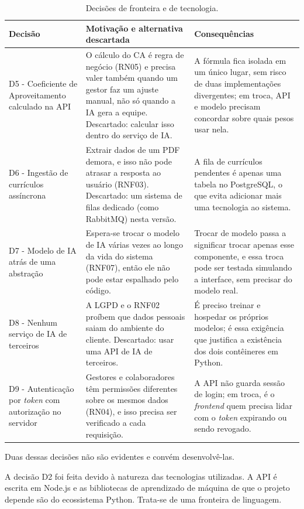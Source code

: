 \documentclass[a4paper,12pt,oneside,openany]{book}
\begin{document}
\begin{table}[H]
\centering
\small
\caption{Decisões de fronteira e de tecnologia.}
\label{tab:adr-fronteira}
\begin{tabularx}{0.97\textwidth}{p{} X X}
\toprule
\textbf{Decisão} & \textbf{Motivação e alternativa descartada} &
\textbf{Consequências} \\
\midrule
D5 - Coeficiente de Aproveitamento calculado na API & O cálculo do CA é
regra de negócio (RN05) e precisa valer também quando um gestor faz um ajuste
manual, não só quando a IA gera a equipe. Descartado: calcular isso dentro do
serviço de IA. & A fórmula fica isolada em um único lugar, sem risco de duas
implementações divergentes; em troca, API e modelo precisam concordar sobre
quais pesos usar nela. \\
D6 - Ingestão de currículos assíncrona & Extrair dados de um PDF demora, e
isso não pode atrasar a resposta ao usuário (RNF03). Descartado: um sistema
de filas dedicado (como RabbitMQ) nesta versão. & A fila de currículos
pendentes é apenas uma tabela no PostgreSQL, o que evita adicionar mais uma
tecnologia ao sistema. \\
D7 - Modelo de IA atrás de uma abstração & Espera-se trocar o modelo de IA
várias vezes ao longo da vida do sistema (RNF07), então ele não pode estar
espalhado pelo código. & Trocar de modelo passa a significar trocar apenas
esse componente, e essa troca pode ser testada simulando a interface, sem
precisar do modelo real. \\
D8 - Nenhum serviço de IA de terceiros & A LGPD e o RNF02 proíbem que dados
pessoais saiam do ambiente do cliente. Descartado: usar uma API de IA de
terceiros. & É preciso treinar e hospedar os próprios modelos; é essa
exigência que justifica a existência dos dois contêineres em Python. \\
D9 - Autenticação por \textit{token} com autorização no servidor &
Gestores e colaboradores têm permissões diferentes sobre os mesmos dados
(RN04), e isso precisa ser verificado a cada requisição. & A API não guarda
sessão de login; em troca, é o \textit{frontend} quem precisa lidar com o
\textit{token} expirando ou sendo revogado. \\
\bottomrule
\end{tabularx}
\end{table}

Duas dessas decisões não são evidentes e convém desenvolvê-las.

A decisão D2 foi feita devido à natureza das tecnologias utilizadas. A API é escrita em
Node.js e as bibliotecas de aprendizado de máquina de que o projeto depende são
do ecossistema Python. Trata-se de uma fronteira de linguagem.
\end{document}
